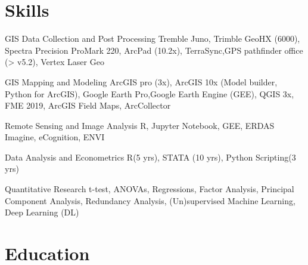 \documentclass[11pt,a4paper,]{awesome-cv}
\begin{document}
\section{Skills}\label{skills}

\begin{cvskills}
  \cvskill
    {GIS Data Collection and 
    Post Processing}
    {Tremble Juno, Trimble GeoHX (6000), Spectra Precision ProMark 220, ArcPad (10.2x), TerraSync,\newline GPS pathfinder office (> v5.2), Vertex Laser Geo}

  \cvskill
    {GIS Mapping and Modeling}
    {ArcGIS pro (3x), ArcGIS 10x (Model builder, Python for ArcGIS), Google Earth Pro,\newline Google Earth Engine (GEE), QGIS 3x, FME 2019, ArcGIS Field Maps, ArcCollector}

  \cvskill
    {Remote Sensing and Image Analysis}
    {R, Jupyter Notebook, GEE, ERDAS Imagine, eCognition, ENVI}

  \cvskill
    {Data Analysis and Econometrics}
    {R(5 yrs), STATA (10 yrs), Python Scripting(3 yrs)}

  \cvskill
    {Quantitative Research}
    {t-test, ANOVAs, Regressions, Factor Analysis, Principal Component Analysis, Redundancy Analysis,\newline
    (Un)supervised Machine Learning, Deep Learning (DL)}
\end{cvskills}

\section{Education}\label{education}

\begin{cventries}
    \vspace{-4.0mm}
\end{cventries}
\end{document}
